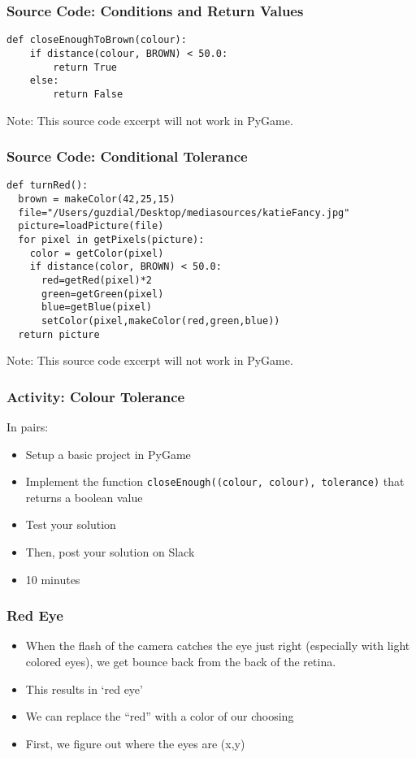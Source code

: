 \begin{frame}[fragile]
	\frametitle{Source Code: Conditions and Return Values}
	
\begin{lstlisting}
def closeEnoughToBrown(colour):
    if distance(colour, BROWN) < 50.0:
        return True
    else:
        return False
\end{lstlisting}

Note: This source code excerpt will not work in PyGame.

\end{frame}

\begin{frame}[fragile]
	\frametitle{Source Code: Conditional Tolerance}
	
\begin{lstlisting}
def turnRed():
  brown = makeColor(42,25,15)
  file="/Users/guzdial/Desktop/mediasources/katieFancy.jpg"
  picture=loadPicture(file)
  for pixel in getPixels(picture):
    color = getColor(pixel)
    if distance(color, BROWN) < 50.0:
      red=getRed(pixel)*2
      green=getGreen(pixel)
      blue=getBlue(pixel)
      setColor(pixel,makeColor(red,green,blue))
  return picture

\end{lstlisting}

Note: This source code excerpt will not work in PyGame.

\end{frame}

\begin{frame}
	\frametitle{Activity: Colour Tolerance}
	
	In pairs:
	
	\vspace{2em}
	
	\begin{itemize}		
		\item Setup a basic project in PyGame
		\item Implement the function \texttt{closeEnough((colour, colour), tolerance)} that returns a boolean value
		\item Test your solution
		\item Then, post your solution on Slack
		\item 10 minutes
	\end{itemize}
\end{frame}

\begin{frame}
	\frametitle{Red Eye}
	
	\begin{itemize}		
		\item When the flash of the camera catches the eye just right (especially with light colored eyes), we get bounce back from the back of the retina.
		\item This results in `red eye'
		\item We can replace the “red” with a color of our choosing
		\item First, we figure out where the eyes are (x,y)
	\end{itemize}
\end{frame}

